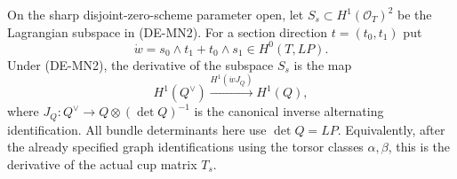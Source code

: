 \begin{lemma}
\label{lem:DE-A3-positive-monad-variation-note}
On the sharp disjoint-zero-scheme parameter open, let
$S_s\subset H^1(\mathcal O_T)^2$ be the Lagrangian subspace in
(DE-MN2). For a section direction $t=(t_0,t_1)$ put
\[
 \dot w=s_0\wedge t_1+t_0\wedge s_1\in H^0(T,LP).
\]
Under (DE-MN2), the derivative of the subspace $S_s$ is the map
\[
 H^1(Q^\vee)\xrightarrow{H^1(\dot w J_Q)}H^1(Q),        \tag{DE-MN3}
\]
where $J_Q:Q^\vee\to Q\otimes(\det Q)^{-1}$ is the canonical
inverse alternating identification. All bundle determinants here
use $\det Q=LP$.
Equivalently, after the already specified graph identifications
using the torsor classes $\alpha,\beta$, this is the derivative
of the actual cup matrix $T_s$.
\end{lemma}
